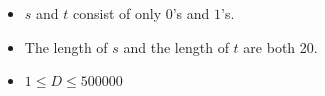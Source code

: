 \begin{itemize}
\tightlist
\item $s$ and $t$ consist of only $0$'s and $1$'s.
\item The length of $s$ and the length of $t$ are both 20.
\item $1\le D\le 500000$
\end{itemize}
